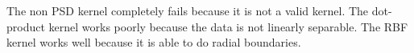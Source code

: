 \begin{answer}
    The non PSD kernel completely fails because it is not a valid kernel.
    The dot-product kernel works poorly because the data is not linearly
    separable. The RBF kernel works well because it is able to do radial
    boundaries.
\end{answer}
